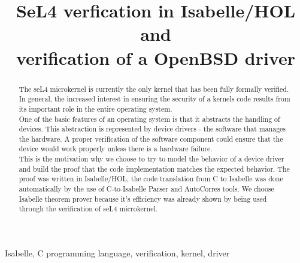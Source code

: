 \documentclass[conference]{IEEEtran}
\begin{document}
\title{SeL4 verfication in Isabelle/HOL and \\
verification of a OpenBSD driver}

\author{
\and
{}
\and
{}
}

\maketitle

\begin{abstract}
The seL4 microkernel is currently the only kernel that has been fully formally verified. In general, the increased interest in ensuring the security of a kernel\textquotesingle s code results from its important role in the entire operating system. \\
One of the basic features of an operating system is that it abstracts the handling of devices. This abstraction is represented by device drivers - the software that manages the hardware. A proper verification of the software component could ensure that the device would work properly unless there is a hardware failure. \\
This is the motivation why we choose to try to model the behavior of a device driver and build the proof that the code implementation matches the expected behavior. The proof was written in Isabelle/HOL, the code translation from C to Isabelle was done automatically by the use of C-to-Isabelle Parser and AutoCorres tools. We choose Isabelle theorem prover because it’s efficiency was already shown by being used through the verification of seL4 microkernel.
\end{abstract}

\begin{IEEEkeywords}
Isabelle, C programming language, verification, kernel, driver
\end{IEEEkeywords}
\end{document}
